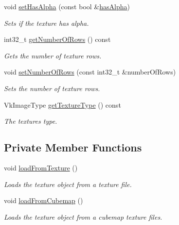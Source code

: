 \begin{DoxyCompactItemize}
void \hyperlink{classflounder_1_1texture_ac05209e3a9686903a336575ac71b8f0e}{set\+Has\+Alpha} (const bool \&\hyperlink{classflounder_1_1texture_aa74c0c1cb920f5f131832ec6498eba47}{has\+Alpha})
\begin{DoxyCompactList}\small\item\em Sets if the texture has alpha. \end{DoxyCompactList}\item 
int32\+\_\+t \hyperlink{classflounder_1_1texture_a299af5830ad52b5759014e363805e49b}{get\+Number\+Of\+Rows} () const
\begin{DoxyCompactList}\small\item\em Gets the number of texture rows. \end{DoxyCompactList}\item 
void \hyperlink{classflounder_1_1texture_a3afb09cb387467fcae976fb1bbe5ded7}{set\+Number\+Of\+Rows} (const int32\+\_\+t \&number\+Of\+Rows)
\begin{DoxyCompactList}\small\item\em Sets the number of texture rows. \end{DoxyCompactList}\item 
Vk\+Image\+Type \hyperlink{classflounder_1_1texture_acf43aa80310fb81f1ffd559b7c3e2434}{get\+Texture\+Type} () const
\begin{DoxyCompactList}\small\item\em The textures type. \end{DoxyCompactList}\end{DoxyCompactItemize}
\subsection*{Private Member Functions}
\begin{DoxyCompactItemize}
\item 
void \hyperlink{classflounder_1_1texture_ae16fb1bee340a680060e45dfa527e57d}{load\+From\+Texture} ()
\begin{DoxyCompactList}\small\item\em Loads the texture object from a texture file. \end{DoxyCompactList}\item 
void \hyperlink{classflounder_1_1texture_a846a34a57f31c5bae8ad856d589bbd83}{load\+From\+Cubemap} ()
\begin{DoxyCompactList}\small\item\em Loads the texture object from a cubemap texture files. \end{DoxyCompactList}\end{DoxyCompactItemize}
